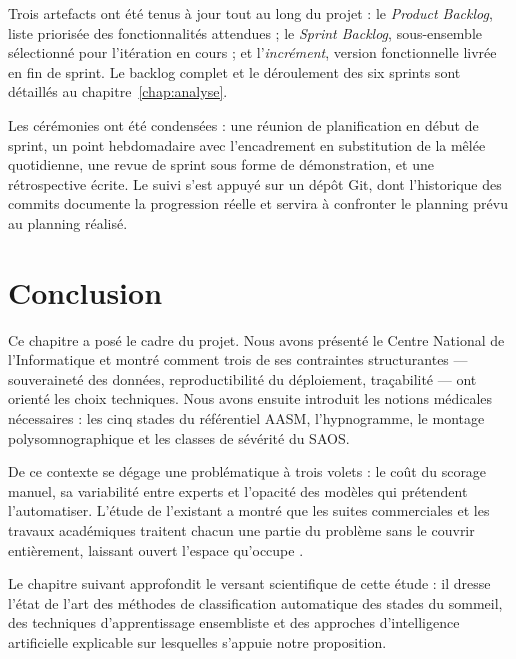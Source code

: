 Trois artefacts ont été tenus à jour tout au long du projet : le \emph{Product
Backlog}, liste priorisée des fonctionnalités attendues ; le \emph{Sprint Backlog},
sous-ensemble sélectionné pour l'itération en cours ; et l'\emph{incrément}, version
fonctionnelle livrée en fin de sprint. Le backlog complet et le déroulement des six
sprints sont détaillés au chapitre~\ref{chap:analyse}.

Les cérémonies ont été condensées : une réunion de planification en début de sprint,
un point hebdomadaire avec l'encadrement en substitution de la mêlée quotidienne, une
revue de sprint sous forme de démonstration, et une rétrospective écrite. Le suivi
s'est appuyé sur un dépôt Git, dont l'historique des commits documente la progression
réelle et servira à confronter le planning prévu au planning réalisé.

\section{Conclusion}

Ce chapitre a posé le cadre du projet. Nous avons présenté le Centre National de
l'Informatique et montré comment trois de ses contraintes structurantes — souveraineté
des données, reproductibilité du déploiement, traçabilité — ont orienté les choix
techniques. Nous avons ensuite introduit les notions médicales nécessaires : les cinq
stades du référentiel AASM, l'hypnogramme, le montage polysomnographique et les
classes de sévérité du SAOS.

De ce contexte se dégage une problématique à trois volets : le coût du scorage
manuel, sa variabilité entre experts et l'opacité des modèles qui prétendent
l'automatiser. L'étude de l'existant a montré que les suites commerciales et les
travaux académiques traitent chacun une partie du problème sans le couvrir
entièrement, laissant ouvert l'espace qu'occupe \hypnoria{}.

Le chapitre suivant approfondit le versant scientifique de cette étude : il dresse
l'état de l'art des méthodes de classification automatique des stades du sommeil, des
techniques d'apprentissage ensembliste et des approches d'intelligence artificielle
explicable sur lesquelles s'appuie notre proposition.

